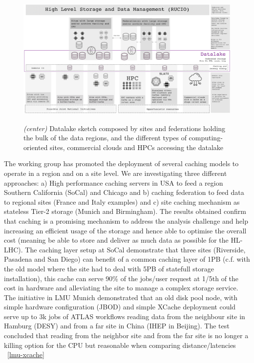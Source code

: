 \begin{figure}[h]
  \centering
  \includegraphics[height=6.8cm]{datalake-sketch.png}
  \caption{{\em (center)} Datalake sketch composed by sites and federations holding the bulk of the data regions, and the different types of computing-oriented sites, commercial clouds and HPCs accessing the datalake }
  \label{fig:datalake-sketch}
\end{figure}
The working group has promoted the deployment of several caching models to operate in a region and on a site level. We are investigating three different approaches: a) High performance caching servers in USA to feed a region Southern California (SoCal) and Chicago and b) caching federation to feed data to regional sites (France and Italy examples) and c) site caching mechanism as stateless Tier-2 storage (Munich and Birmingham). The results obtained confirm that caching is a promising mechanism to address the analysis challenge and help increasing an efficient usage of the storage and hence able to optimise the overall cost (meaning be able to store and deliver as much data as possible for the HL-LHC). The caching layer setup at SoCal demonstrate that three sites (Riverside, Pasadena and San Diego) can benefit of a common caching layer of 1PB (c.f. with the old model where the site had to deal with 5PB of statefull storage installation), this cache can serve 90\% of the jobs/user request at 1/5th of the cost in hardware and alleviating the site to manage a complex storage service.\\
The initiative in LMU Munich demonstrated that an old disk pool node, with simple hardware configuration (JBOD) and simple XCache deployment could serve up to 3k jobs of ATLAS workflows reading data from the neighbour site in Hamburg (DESY) and from a far site in China (IHEP in Beijing). The test concluded that reading from the neighbor site and from the far site is no longer a killing option for the CPU but reasonable when comparing distance/latencies ~\ref{lmu-xcache}

